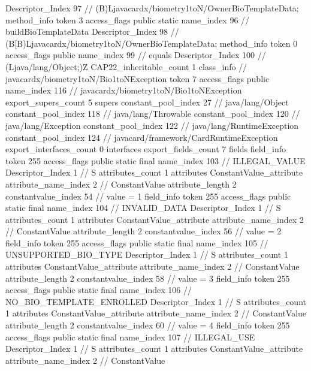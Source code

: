 {{{{{					Descriptor_Index	97		// (B)Ljavacardx/biometry1toN/OwnerBioTemplateData;
				}
				method_info {
					token	3
					access_flags	public static
					name_index	96		// buildBioTemplateData
					Descriptor_Index	98		// (B[B)Ljavacardx/biometry1toN/OwnerBioTemplateData;
				}
				method_info {
					token	0
					access_flags	public
					name_index	99		// equals
					Descriptor_Index	100		// (Ljava/lang/Object;)Z
				}
			}
			CAP22_inheritable_count	1
		}
		class_info {		// javacardx/biometry1toN/Bio1toNException
			token	7
			access_flags	public
			name_index	116		// javacardx/biometry1toN/Bio1toNException
			export_supers_count	5
			supers {
				constant_pool_index	27		// java/lang/Object
				constant_pool_index	118		// java/lang/Throwable
				constant_pool_index	120		// java/lang/Exception
				constant_pool_index	122		// java/lang/RuntimeException
				constant_pool_index	124		// javacard/framework/CardRuntimeException
			}
			export_interfaces_count	0
			interfaces {
			}
			export_fields_count	7
			fields {
			field_info {
				token	255
				access_flags	public static final
				name_index	103		// ILLEGAL_VALUE
				Descriptor_Index	1		// S
				attributes_count	1
				attributes {
				ConstantValue_attribute {
					attribute_name_index	2		// ConstantValue
					attribute_length	2
					constantvalue_index	54		// value = 1
				}
				}
			}
			field_info {
				token	255
				access_flags	public static final
				name_index	104		// INVALID_DATA
				Descriptor_Index	1		// S
				attributes_count	1
				attributes {
				ConstantValue_attribute {
					attribute_name_index	2		// ConstantValue
					attribute_length	2
					constantvalue_index	56		// value = 2
				}
				}
			}
			field_info {
				token	255
				access_flags	public static final
				name_index	105		// UNSUPPORTED_BIO_TYPE
				Descriptor_Index	1		// S
				attributes_count	1
				attributes {
				ConstantValue_attribute {
					attribute_name_index	2		// ConstantValue
					attribute_length	2
					constantvalue_index	58		// value = 3
				}
				}
			}
			field_info {
				token	255
				access_flags	public static final
				name_index	106		// NO_BIO_TEMPLATE_ENROLLED
				Descriptor_Index	1		// S
				attributes_count	1
				attributes {
				ConstantValue_attribute {
					attribute_name_index	2		// ConstantValue
					attribute_length	2
					constantvalue_index	60		// value = 4
				}
				}
			}
			field_info {
				token	255
				access_flags	public static final
				name_index	107		// ILLEGAL_USE
				Descriptor_Index	1		// S
				attributes_count	1
				attributes {
				ConstantValue_attribute {
					attribute_name_index	2		// ConstantValue
}}}}}}}
